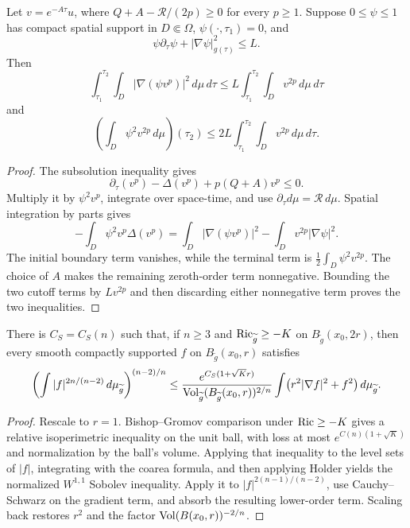 \begin{lemma}
\label{lem:chow-iii-reverse-poincare}
Let \(v=e^{-A\tau}u\), where
\(Q+A-\mathcal R/(2p)\geq0\) for every \(p\geq1\).  Suppose
\(0\leq\psi\leq1\) has compact spatial support in \(D\Subset\Omega\),
\(\psi(\cdot,\tau_1)=0\), and
\[
 \psi\partial_\tau\psi+|\nabla\psi|_{g(\tau)}^2\leq L.
\]
Then
\[
 \int_{\tau_1}^{\tau_2}\int_D|\nabla(\psi v^p)|^2\,d\mu\,d\tau
 \leq L\int_{\tau_1}^{\tau_2}\int_Dv^{2p}\,d\mu\,d\tau
\]
and
\[
 \left(\int_D\psi^2v^{2p}\,d\mu\right)(\tau_2)
 \leq2L\int_{\tau_1}^{\tau_2}\int_Dv^{2p}\,d\mu\,d\tau.
\]
\end{lemma}
\begin{proof}
The subsolution inequality gives
\[
 \partial_\tau(v^p)-\Delta(v^p)+p(Q+A)v^p\leq0.
\]
Multiply it by \(\psi^2v^p\), integrate over space-time, and use
\(\partial_\tau d\mu=\mathcal R\,d\mu\).  Spatial integration by parts gives
\[
 -\int_D\psi^2v^p\Delta(v^p)
 =\int_D|\nabla(\psi v^p)|^2-\int_Dv^{2p}|\nabla\psi|^2.
\]
The initial boundary term vanishes, while the terminal term is
\(\frac12\int_D\psi^2v^{2p}\).  The choice of \(A\) makes the remaining
zeroth-order term nonnegative.  Bounding the two cutoff terms by \(Lv^{2p}\)
and then discarding either nonnegative term proves the two inequalities.
\end{proof}

\begin{proposition}
\label{prop:chow-iii-local-sobolev-ball}
There is \(C_S=C_S(n)\) such that, if \(n\geq3\) and
\(\operatorname{Ric}_{\widetilde g}\geq-K\) on \(B_{\widetilde g}(x_0,2r)\), then every
smooth compactly supported \(f\) on \(B_{\widetilde g}(x_0,r)\) satisfies
\[
 \left(\int |f|^{2n/(n-2)}\,d\mu_{\widetilde g}\right)^{(n-2)/n}
 \leq
 \frac{e^{C_S(1+\sqrt K r)}}
 {\operatorname{Vol}_{\widetilde g}(B_{\widetilde g}(x_0,r))^{2/n}}
 \int\bigl(r^2|\nabla f|^2+f^2\bigr)\,d\mu_{\widetilde g}.
\]
\end{proposition}
\begin{proof}
Rescale to \(r=1\).  Bishop--Gromov comparison under
\(\operatorname{Ric}\geq-K\) gives a relative isoperimetric inequality on the unit ball,
with loss at most \(e^{C(n)(1+\sqrt K)}\) and normalization by the ball's
volume.  Applying that inequality to the level sets of \(|f|\), integrating
with the coarea formula, and then applying Holder yields the normalized
\(W^{1,1}\) Sobolev inequality.  Apply it to
\(|f|^{2(n-1)/(n-2)}\), use Cauchy--Schwarz on the gradient term, and absorb
the resulting lower-order term.  Scaling back restores \(r^2\) and the
factor \(\operatorname{Vol}(B(x_0,r))^{-2/n}\).
\end{proof}

